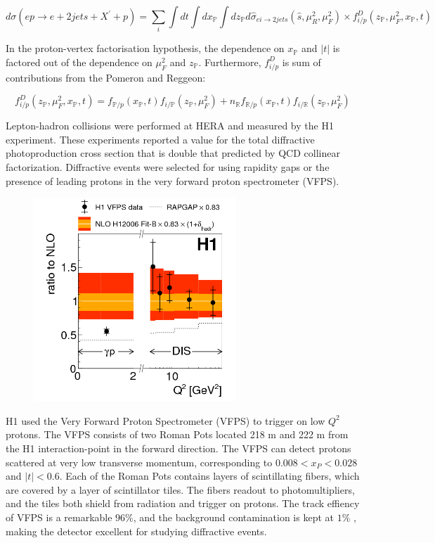 \begin{equation}
d\sigma (ep \rightarrow e + 2 jets + X^{'} + p) = \sum_{i} \int dt \int dx_\mathbb{P} \int dz_\mathbb{P} d\hat{\sigma}_{ei\rightarrow 2jets}(\hat{s},\mu^2_R,\mu^2_F)\times f^D_{i/p}(z_\mathbb{P},\mu^2_F,x_\mathbb{P},t)
\end{equation}

In the proton-vertex factorisation hypothesis, the dependence on $x_{\mathbb{P}}$ and $|t|$ is factored out of the dependence on $\mu^2_F$ and $z_{\mathbb{P}}$. Furthermore, $f^D_{i/p}$ is sum of contributions from the Pomeron and Reggeon:

\begin{equation}
f^D_{i/p}(z_{\mathbb{P}},\mu^2_F,x_{\mathbb{P}},t) = f_{\mathbb{P}/p}(x_{\mathbb{P}},t)f_{i/\mathbb{P}}(z_{\mathbb{P}},\mu^2_F) + n_\mathbb{R}f_{\mathbb{R}/p}(x_{\mathbb{P}},t)f_{i/\mathbb{R}}(z_{\mathbb{P}},
\mu^2_F) 
\end{equation}

Lepton-hadron collisions were performed at HERA and measured by the H1 experiment. These experiments reported a value for the total diffractive photoproduction cross section that is double that predicted by QCD collinear factorization. Diffractive events were selected for using rapidity gaps or the presence of leading protons in the very forward proton spectrometer (VFPS). 

\begin{figure}[h!]
\begin{centering}
\includegraphics[width=3in]{Chapter2/importfigs/fig8_h1_2015.png}
\par\end{centering}
\end{figure}

H1 used the Very Forward Proton Spectrometer (VFPS) to trigger on low $Q^2$ protons. The VFPS consists of two Roman Pots located 218 m and 222 m from the H1 interaction-point in the forward direction. The VFPS can detect protons scattered at very low transverse momentum, corresponding to $0.008 < x_{P} < 0.028$ and $|t|<0.6$. Each of the Roman Pots contains layers of scintillating fibers, which are covered by a layer of scintillator tiles. The fibers readout to photomultipliers, and the tiles both shield from radiation and trigger on protons. The track effiency of VFPS is a remarkable $96 \%$, and the background contamination is kept at $1 \%$ , making the detector excellent for studying diffractive events.


